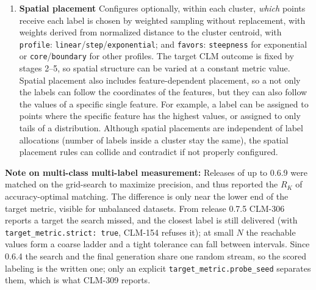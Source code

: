 \documentclass[a4paper,12pt]{article}
\begin{document}
\begin{enumerate}
Currently, three CLM measures are available: \texttt{clustering\_mcc\_pair} is the $2\times2$ Matthews $\phi$ of a cluster against a label, which does not need matching. \texttt{clustering\_mcc} is the permutation-invariant \texttt{scikit-learn} implementation of Gorodkin's  $R_K$, which is a one-to-one matching of the cluster--label contingency table that maximizes $R_K$. A solution that converged internally can still land outside the tolerance, most visible at small $N$, where the placement of spillovers is a large part of the result.

\texttt{clustering\_ari} is solved for the adjusted Rand index (ARI): The ARI measures the agreement over \emph{pairs} of points rather than through any correspondence between the label and cluster identifiers, and is chance-corrected so that independent partitions score $0$. Because it is a function of the cell of the contingency table and the marginal pair counts alone, it does not need an alignment step: permuting the values of the generated label leaves it unchanged, it is symmetric in its two arguments, and it is defined for any $M$ and $K$.
    
    \item \textbf{Spatial placement} Configures optionally, within each cluster, \emph{which} points receive each label is chosen by weighted sampling without replacement, with weights derived from normalized distance to the cluster centroid, with \texttt{profile}: \texttt{linear}/\texttt{step}/\texttt{exponential}; and \texttt{favors}: \texttt{steepness} for exponential or \texttt{core}/\texttt{boundary} for other profiles. The target CLM outcome is fixed by stages 2--5, so spatial structure can be varied at a constant metric value.\\
    Spatial placement also includes feature-dependent placement, so a not only the labels can follow the coordinates of the features, but they can also follow the values of a specific single feature. For example, a label can be assigned to points where the specific feature has the highest values, or assigned to only tails of a distribution. Although spatial placements are independent of label allocations (number of labels inside a cluster stay the same), the spatial placement rules can collide and contradict if not properly configured.
    
\end{enumerate}

\noindent\textbf{Note on multi-class multi-label measurement:} Releases of up to 0.6.9 were matched on the grid-search to maximize precision, and thus reported the $R_K$ of accuracy-optimal matching. The difference is only near the lower end of the target metric, visible for unbalanced datasets. From release 0.7.5 CLM-306 reports a target the search missed, and the closest label is still delivered (with \texttt{target\_metric.strict: true}, CLM-154 refuses it); at small $N$ the reachable values form a coarse ladder and a tight tolerance can fall between intervals. Since 0.6.4 the search and the final generation share one random stream, so the scored labeling is the written one; only an explicit \texttt{target\_metric.probe\_seed} separates them, which is what CLM-309 reports.
\end{document}
